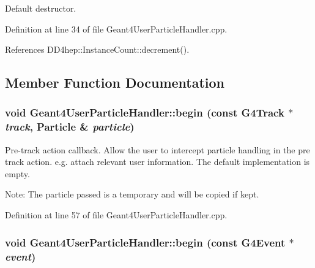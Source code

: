 Default destructor. 

Definition at line 34 of file Geant4UserParticleHandler.cpp.

References DD4hep::InstanceCount::decrement().

\subsection{Member Function Documentation}
\hypertarget{class_d_d4hep_1_1_simulation_1_1_geant4_user_particle_handler_a1a26c0a3a16679a1378cfcdfbc5800e2}{
\subsubsection[{begin}]{\setlength{\rightskip}{0pt plus 5cm}void Geant4UserParticleHandler::begin (const G4Track $\ast$ {\em track}, \/  {\bf Particle} \& {\em particle})}}
\label{class_d_d4hep_1_1_simulation_1_1_geant4_user_particle_handler_a1a26c0a3a16679a1378cfcdfbc5800e2}


Pre-\/track action callback. Allow the user to intercept particle handling in the pre track action. e.g. attach relevant user information. The default implementation is empty.

Note: The particle passed is a temporary and will be copied if kept. 

Definition at line 57 of file Geant4UserParticleHandler.cpp.\hypertarget{class_d_d4hep_1_1_simulation_1_1_geant4_user_particle_handler_ad63271464e7ae89e8e7ec0149bc92b93}{
\subsubsection[{begin}]{\setlength{\rightskip}{0pt plus 5cm}void Geant4UserParticleHandler::begin (const G4Event $\ast$ {\em event})}}
\label{class_d_d4hep_1_1_simulation_1_1_geant4_user_particle_handler_ad63271464e7ae89e8e7ec0149bc92b93}


